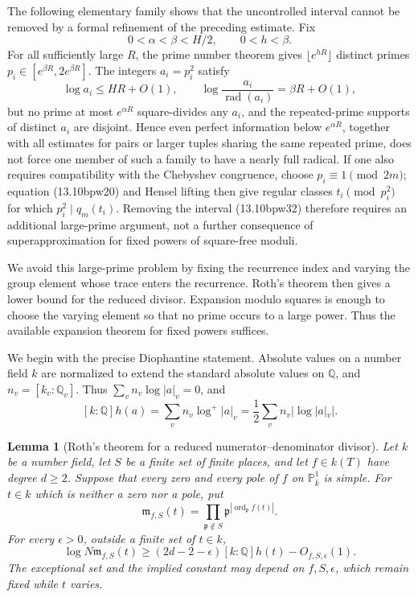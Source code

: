 \documentclass[11pt,reqno]{amsart}
\newtheorem{lemma}[theorem]{Lemma}
\theoremstyle{definition}
\theoremstyle{remark}
\newcommand{\Q}{\mathbb Q}
\begin{document}
The following elementary family shows that the uncontrolled interval cannot
be removed by a formal refinement of the preceding estimate.  Fix
\[
 0<\alpha<\beta<H/2,\qquad 0<h<\beta.
\]
For all sufficiently large \(R\), the prime number theorem gives
\(\lfloor e^{hR}\rfloor\) distinct primes
\(p_i\in[e^{\beta R},2e^{\beta R}]\).  The integers
\(a_i=p_i^2\) satisfy
\[
 \log a_i\le HR+O(1),\qquad
 \log\frac{a_i}{\operatorname{rad}(a_i)}
   =\beta R+O(1),
\]
but no prime at most \(e^{\alpha R}\) square-divides any \(a_i\), and
the repeated-prime supports of distinct \(a_i\) are disjoint.  Hence even
perfect information below \(e^{\alpha R}\), together with all estimates
for pairs or larger tuples sharing the same repeated prime, does not force
one member of such a family to have a nearly full radical.  If one also
requires compatibility with the Chebyshev congruence, choose
\(p_i\equiv1\pmod{2m}\); equation (13.10bpw20) and Hensel lifting then
give regular classes \(t_i\pmod{p_i^2}\) for which
\(p_i^2\mid q_m(t_i)\).  Removing the interval (13.10bpw32) therefore
requires an additional large-prime argument, not a further consequence of
superapproximation for fixed powers of square-free moduli.

We avoid this large-prime problem by fixing the recurrence index and varying
the group element whose trace enters the recurrence.  Roth's theorem then
gives a lower bound for the reduced divisor.  Expansion modulo squares is
enough to choose the varying element so that no prime occurs to a large
power.  Thus the available expansion theorem for fixed powers suffices.

We begin with the precise Diophantine statement.  Absolute values on a number
field \(k\) are normalized to extend the standard absolute values on
\(\Q\), and \(n_v=[k_v:\Q_v]\).  Thus
\(\sum_v n_v\log|a|_v=0\), and
\[
 [k:\Q]h(a)=\sum_v n_v\log^+|a|_v
 =\frac12\sum_v n_v|\log|a|_v|.
\]

\begin{lemma}[Roth's theorem for a reduced numerator--denominator divisor]
\label{lem:roth-reduced-divisor}
Let \(k\) be a number field, let \(S\) be a finite set of finite places,
and let \(f\in k(T)\) have degree \(d\ge2\).  Suppose that every zero and
every pole of \(f\) on \(\mathbb P^1_{\overline k}\) is simple.  For
\(t\in k\) which is neither a zero nor a pole, put
\[
 \mathfrak m_{f,S}(t)=
 \prod_{\mathfrak p\notin S}
 \mathfrak p^{|\operatorname{ord}_{\mathfrak p}f(t)|}.
\]
For every \(\epsilon>0\), outside a finite set of \(t\in k\),
\[
 \log N\mathfrak m_{f,S}(t)
 \ge (2d-2-\epsilon)[k:\Q]h(t)-O_{f,S,\epsilon}(1).
\tag{13.10mov1}
\]
The exceptional set and the implied constant may depend on
\(f,S,\epsilon\), which remain fixed while \(t\) varies.
\end{lemma}
\end{document}
